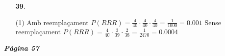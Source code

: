 \documentclass[a4paper, pdf, twoside]{book}
\begin{document}
\begin{multicols}{2}
\begin{enumerate}

 \item[\fontfamily{phv}\selectfont\color{blue}\textbf{39}. ] 
 \begin{tasks}[column-sep=1em, item-indent=1.3333em](1)
	 \task* Amb reemplaçament $P(RRR)=\frac {4}{40}\cdot \frac {4}{40} \cdot \frac {4}{40} =\frac {1}{1000}=0.001$
	 \task* Sense reemplaçament $P(RRR)=\frac {4}{40}\cdot \frac {3}{39} \cdot \frac {2}{38} =\frac {1}{2470}=0.0004$
\end{tasks}
 \end{enumerate}
\vspace{0.3cm}


{\textbf{\em Pàgina 57}} \hrulefill
\begin{enumerate}
\vspace{0.25cm}




\end{enumerate}
\end{multicols}
\end{document}
